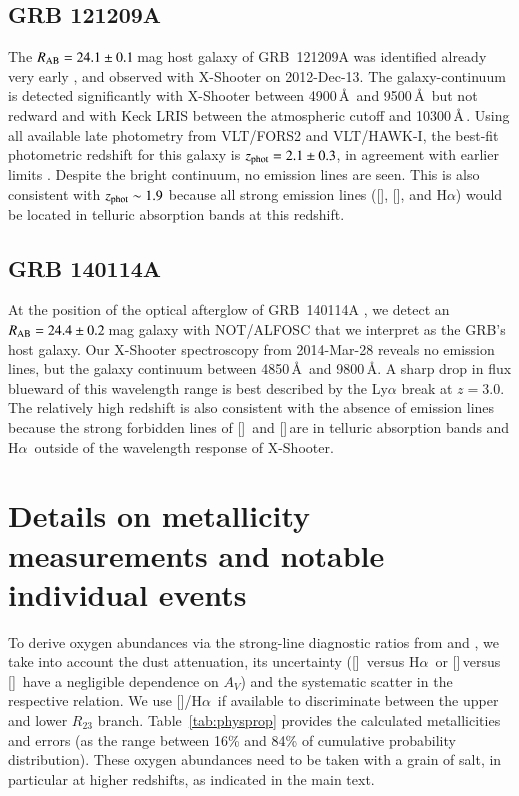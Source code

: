 \documentclass[traditabstract, longauth]{aa}
\newcommand{\ha}{H$\alpha$}
\newcommand{\oii}{[\ion{O}{ii}]}
\newcommand{\oiii}{[\ion{O}{iii}]}
\newcommand{\neiii}{[\ion{Ne}{iii}]}
\newcommand{\nii}{[\ion{N}{ii}]}
\begin{document}
\begin{appendix}
\subsection{GRB 121209A}

The $R_{\rm{AB}}=24.1\pm0.1$\,mag host galaxy of GRB~121209A \citep{2012GCN..14045...1M} was identified already very early \citep{2012GCN..14049...1K, 2012GCN..14056...1P}, and observed with X-Shooter on 2012-Dec-13. The galaxy-continuum is detected significantly with X-Shooter between 4900\,\AA\, and 9500\,\AA\, but not redward and with Keck LRIS between the atmospheric cutoff and 10300\,\AA\,\citep{2012GCN..14056...1P}. Using all available late photometry from VLT/FORS2 and VLT/HAWK-I, the best-fit photometric redshift for this galaxy is $z_{\rm{phot}} = 2.1\pm0.3$, in agreement with earlier limits \citep{2012GCN..14056...1P}. Despite the bright continuum, no emission lines are seen. This is also consistent with $z_{\rm{phot}}\sim1.9$ because all strong emission lines (\oiii, \oii, and \ha) would be located in telluric absorption bands at this redshift. 

\subsection{GRB 140114A}

At the position of the optical afterglow \citep{2014GCN..15732...1B, 2014GCN..15743...1C} of GRB~140114A \citep{2014GCN..15728...1T}, we detect an $R_{\rm{AB}}=24.4\pm0.2\,$mag galaxy with NOT/ALFOSC that we interpret as the GRB's host galaxy. Our X-Shooter spectroscopy from 2014-Mar-28 reveals no emission lines, but the galaxy continuum between 4850\,\AA\, and 9800\,\AA. A sharp drop in flux blueward of this wavelength range is best described by the Ly$\alpha$ break at $z=3.0$. The relatively high redshift is also consistent with the absence of emission lines because the strong forbidden lines of \oii\, and \oiii\,are in telluric absorption bands and \ha\, outside of the wavelength response of X-Shooter.

\section{Details on metallicity measurements and notable individual events}
\label{sec:metmeas}

To derive oxygen abundances via the strong-line diagnostic ratios from \citet{2006A&A...459...85N} and \citet{2008A&A...488..463M}, we take into account the dust attenuation, its uncertainty (\nii\, versus \ha\, or \neiii\,versus \oii\, have a negligible dependence on $A_V$) and the systematic scatter in the respective relation. We use \nii/\ha\, if available to discriminate between the upper and lower $R_{23}$ branch. Table~\ref{tab:physprop} provides the calculated metallicities and errors (as the range between 16\% and 84\% of cumulative probability distribution). These oxygen abundances need to be taken with a grain of salt, in particular at higher redshifts, as indicated in the main text. 


\end{appendix}
\end{document}
